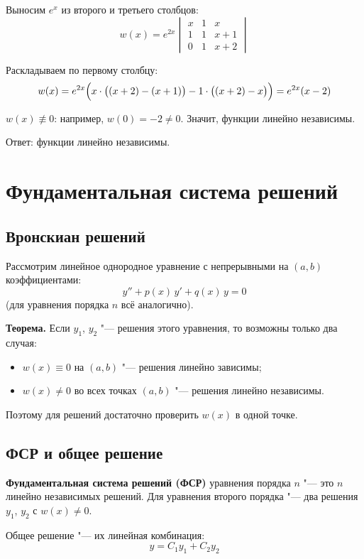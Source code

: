 \documentclass[11pt,a4paper]{article}
\begin{document}
Выносим $e^{x}$ из второго и третьего столбцов:
\[
  w(x) = e^{2x}
  \begin{vmatrix}
    x & 1 & x \\
    1 & 1 & x + 1 \\
    0 & 1 & x + 2
  \end{vmatrix}
\]

Раскладываем по первому столбцу:
\[
  w(x) = e^{2x}\Bigl(x \cdot \bigl((x + 2) - (x + 1)\bigr) - 1 \cdot \bigl((x + 2) - x\bigr)\Bigr)
  = e^{2x}(x - 2)
\]

$w(x) \not\equiv 0$: например, $w(0) = -2 \ne 0$. Значит, функции линейно независимы.


Ответ: функции линейно независимы.

\section*{Фундаментальная система решений}

\subsection*{Вронскиан решений}

Рассмотрим линейное однородное уравнение с непрерывными на $(a, b)$ коэффициентами:
\[
  y'' + p(x)\, y' + q(x)\, y = 0
\]
(для уравнения порядка $n$ всё аналогично).

\textbf{Теорема.} Если $y_1$, $y_2$ "--- решения этого уравнения, то возможны только два случая:
\begin{itemize}
  \item $w(x) \equiv 0$ на $(a, b)$ "--- решения линейно зависимы;
  \item $w(x) \ne 0$ во всех точках $(a, b)$ "--- решения линейно независимы.
\end{itemize}
Поэтому для решений достаточно проверить $w(x)$ в одной точке.

\subsection*{ФСР и общее решение}

\textbf{Фундаментальная система решений (ФСР)} уравнения порядка $n$ "--- это $n$ линейно независимых решений. Для уравнения второго порядка "--- два решения $y_1$, $y_2$ с $w(x) \ne 0$.

Общее решение "--- их линейная комбинация:
\[
  y = C_1 y_1 + C_2 y_2
\]
\end{document}
